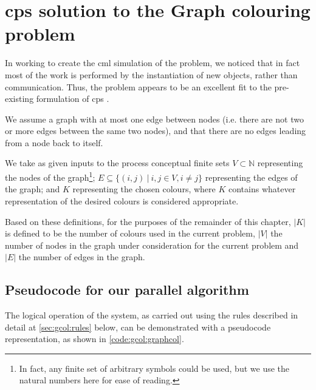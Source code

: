 \section{\label{sec:gcol:cpsys}\texorpdfstring{\gls{cps}}{cP systems} solution to the Graph colouring problem}
In working to create the \gls{cml} simulation of the problem, we noticed that in fact most of the work is performed by the instantiation of new objects, rather than communication.  Thus, the problem appears to be an excellent fit to the pre-existing formulation of \gls{cps} \cite{Nicolescu2018}.

We assume a graph with at most one edge between nodes (i.e. there are not two or more edges between the same two nodes), and that there are no edges leading from a node back to itself.

We take as given inputs to the process conceptual finite sets \(V \subset \mathbb{N}\) representing the nodes of the graph\footnote{In fact, any finite set of arbitrary symbols could be used, but we use the natural numbers here for ease of reading.}; \(E \subseteq \{(i,j)~|~i, j \in V, i \neq j \}\) representing the edges of the graph; and \(K\) representing the chosen colours, where \(K\) contains whatever representation of the desired colours is considered appropriate.

Based on these definitions, for the purposes of the remainder of this chapter, \(|K|\) is defined to be the number of colours used in the current problem, \(|V|\) the number of nodes in the graph under consideration for the current problem and \(|E|\) the number of edges in the graph.

\subsection{Pseudocode for our parallel algorithm}
The logical operation of the system, as carried out using the rules described in detail at \autoref{sec:gcol:rules} below, can be demonstrated with a pseudocode representation, as shown in \autoref{code:gcol:graphcol}.%


